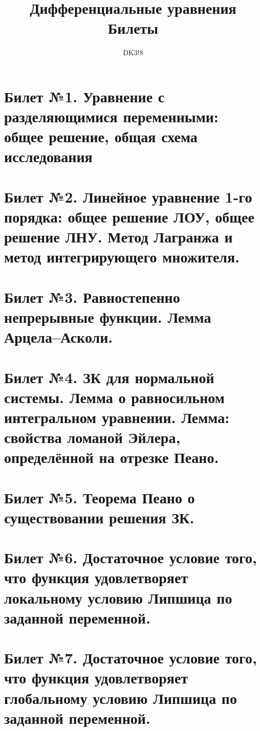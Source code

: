 \documentclass{article}
\title{\textbf{Дифференциальные уравнения\\ Билеты}}
\author{DK3!8}
\begin{document}
  \maketitle

\tableofcontents
\newpage

\section{Билет №1. Уравнение с разделяющимися переменными: общее решение, общая схема
исследования}


\section{Билет №2. Линейное уравнение 1-го порядка: общее решение ЛОУ, общее решение
ЛНУ. Метод Лагранжа и метод интегрирующего множителя.}


\section{Билет №3. Равностепенно непрерывные функции. Лемма Арцела–Асколи.}


\section{Билет №4. ЗК для нормальной системы. Лемма о равносильном интегральном уравнении. Лемма: свойства ломаной Эйлера, определённой на отрезке Пеано.}


\section{Билет №5. Теорема Пеано о существовании решения ЗК.}


\section{Билет №6. Достаточное условие того, что функция удовлетворяет локальному условию Липшица по заданной переменной.}


\section{Билет №7. Достаточное условие того, что функция удовлетворяет глобальному условию Липшица по заданной переменной.}

\end{document}
